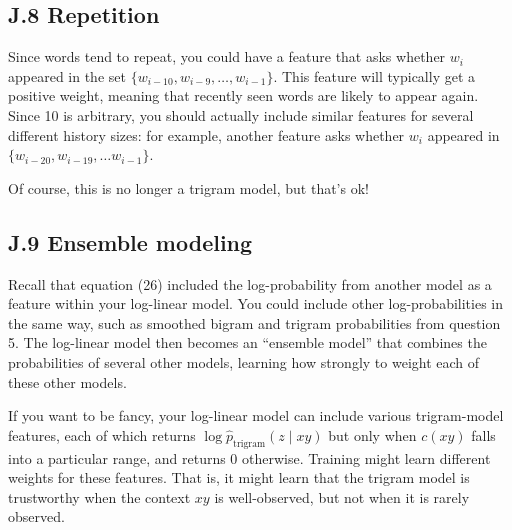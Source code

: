 \documentclass[12pt]{article}
\theoremstyle{plain}
\theoremstyle{definition}
\theoremstyle{remark}
\begin{document}
\subsection*{J.8 Repetition}

Since words tend to repeat, you could have a feature that asks whether $w_i$ appeared in the set $\{w_{i-10}, w_{i-9}, \ldots, w_{i-1}\}$. 
This feature will typically get a positive weight, meaning that recently seen words are likely to appear again. 
Since 10 is arbitrary, you should actually include similar features for several different history sizes: for 
example, another feature asks whether $w_i$ appeared in $\{w_{i-20}, w_{i-19}, \ldots w_{i-1}\}$. 

Of course, this is no longer a trigram model, but that’s ok! 

\subsection*{J.9 Ensemble modeling}

Recall that equation (26) included the log-probability from another model as a feature within your log-linear 
model. You could include other log-probabilities in the same way, such as smoothed bigram and trigram 
probabilities from question 5. The log-linear model then becomes an “ensemble model” that combines the 
probabilities of several other models, learning how strongly to weight each of these other models. 

If you want to be fancy, your log-linear model can include various trigram-model features, each of 
which returns $\log \hat{p}_{\text{trigram}}(z \mid xy)$ but only when $c(xy)$ falls into a particular range, and returns 0 otherwise. 
Training might learn different weights for these features. That is, it might learn that the trigram model is 
trustworthy when the context $xy$ is well-observed, but not when it is rarely observed. 
\end{document}
